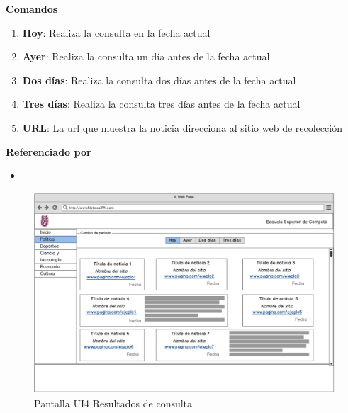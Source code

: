 \textbf{Comandos}

\begin{enumerate}

  \item \textbf{Hoy}: Realiza la consulta en la fecha actual
  \item \textbf{Ayer}: Realiza la consulta un día antes de la fecha actual
  \item \textbf{Dos días}: Realiza la consulta dos días antes de la fecha actual
  \item \textbf{Tres días}: Realiza la consulta tres días antes de la fecha actual
  \item \textbf{URL}: La url que muestra la noticia direcciona al sitio web de recolección


\end{enumerate}

\begin{large}
  \textbf{Referenciado por}
\end{large}

\begin{itemize}

  \item {}

\end{itemize}  



\begin{figure}
  \centering
  \includegraphics[scale=.32]{imagenes/Pantallas/UI4}
  \caption{Pantalla UI4 Resultados de consulta}
  \label{fig:UI4}
\end{figure}

